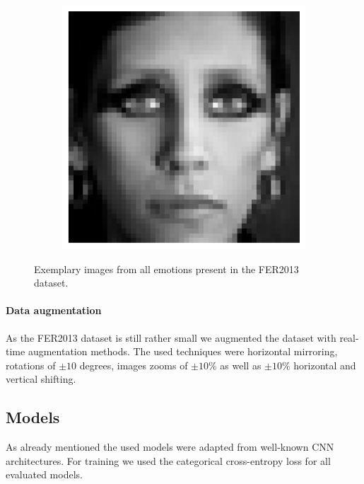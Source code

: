 \documentclass{article}
\begin{document}
\begin{figure}
\begin{subfigure}{0.1\textwidth}
  \end{subfigure}
  \begin{subfigure}{0.1\textwidth}
    \centering
    \includegraphics[width=\textwidth]{"neutral"}
  \end{subfigure}
  \caption{Exemplary images from all emotions present in the FER2013 dataset.}
  \label{fig:emotions}
\end{figure}

\paragraph{Data augmentation} As the FER2013 dataset is still rather small we augmented the dataset with real-time augmentation methods. The used techniques were horizontal mirroring, rotations of $\pm 10$ degrees, images zooms of $\pm 10 \%$ as well as $\pm 10 \%$ horizontal and vertical shifting.

\subsection{Models}
As already mentioned the used models were adapted from well-known CNN architectures. For training we used the categorical cross-entropy loss for all evaluated models.
\end{document}
